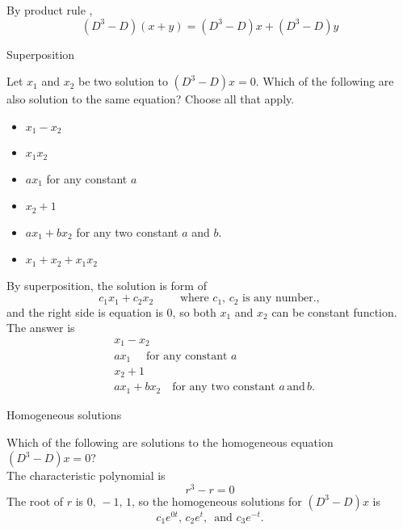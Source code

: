 By product rule ,
\begin{equation*}
  (D^3 -D)(x+y) = (D^3 -D)x + (D^3 -D)y  
\end{equation*}

\begin{problem}
  Superposition
\end{problem}

Let $x_1$ and $x_2$ be two solution to $(D^3 - D)x = 0$. Which of the following are also
solution to the same equation? Choose all that apply.
\begin{itemize}
\item $x_1 - x_2$
\item $x_1 x_2$
\item $ax_1$ for any constant $a$
\item $x_2 + 1$
\item $ax_1 + bx_2$ for any two constant $a$ and $b$.
\item $x_1 + x_2 + x_1 x_2$
\end{itemize}
By superposition, the solution is form of
\begin{equation*}
  c_1 x_1 + c_2 x_2 \qquad \text{ where } c_1,\, c_2 \text{ is any number.}, 
\end{equation*}
and the right side is equation is $0$, so both $x_1$ and $x_2$ can be constant function.\\

The answer is
\begin{align*}
  &x_1 - x_2\\
  &ax_1 \quad \text{ for any constant } a \\
  &x_2 + 1 \\
  &ax_1 + bx_2 \quad \text{for any two constant } a\, \text{and} \,b.
\end{align*}

\begin{problem}
  Homogeneous solutions
\end{problem}
Which of the following are solutions to the homogeneous equation
$(D^3 - D)x = 0$?\\

The characteristic polynomial is
\begin{equation*}
  r^3 - r = 0
\end{equation*}
The root of $r$ is $0,\, -1,\, 1$, so the homogeneous solutions for $(D^3 - D)x$ is
\begin{equation*}
  c_1 e^{0t},\, c_2e^{t},\, \text{ and } c_3 e^{-t}.   
\end{equation*}

